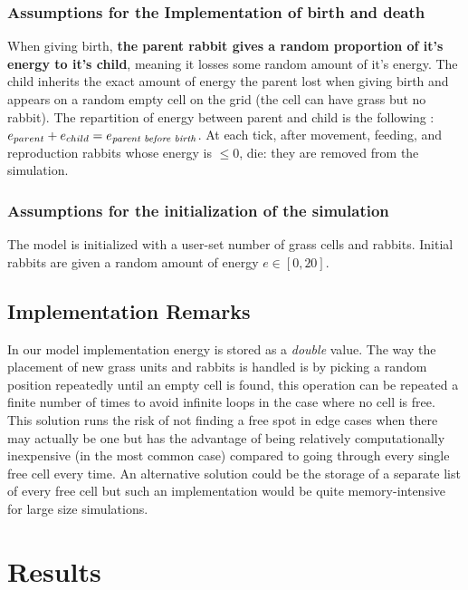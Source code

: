 \documentclass[11pt]{article}
\begin{document}
\subsubsection{Assumptions for the Implementation of birth and death}

When giving birth, \textbf{the parent rabbit gives a random proportion of it's energy to it's child}, meaning it losses some random amount of it's energy. The child inherits the exact amount of energy the parent lost when giving birth and appears on a random empty cell on the grid (the cell can have grass but no rabbit). The repartition of energy between parent and child is the following : $e_{parent} + e_{child} = e_{\text{\textit{parent before birth}}}$. At each tick, after movement, feeding, and reproduction rabbits whose energy is $\leq 0$, die: they are removed from the simulation.

\subsubsection{Assumptions for the initialization of the simulation}

The model is initialized with a user-set number of grass cells and rabbits. Initial rabbits are given a random amount of energy $e \in [0,20]$.

\subsection{Implementation Remarks}

In our model implementation energy is stored as a \textit{double} value. The way the placement of new grass units and rabbits is handled is by picking a random position repeatedly until an empty cell is found, this operation can be repeated a finite number of times to avoid infinite loops in the case where no cell is free. This solution runs the risk of not finding a free spot in edge cases when there may actually be one but has the advantage of being relatively computationally inexpensive (in the most common case) compared to going through every single free cell every time. An alternative solution could be the storage of a separate list of every free cell but such an implementation would be quite memory-intensive for large size simulations.

\section{Results}
\end{document}

